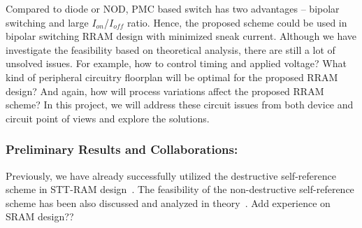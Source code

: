 Compared to diode or NOD, PMC based switch has two advantages -- bipolar switching and large $I_{on}$/$I_{off}$ ratio. Hence, the proposed scheme could be used in bipolar switching RRAM design with minimized sneak current. Although we have investigate the feasibility based on theoretical analysis, there are still a lot of unsolved issues. For example, how to control timing and applied voltage? What kind of peripheral circuitry floorplan will be optimal for the proposed RRAM design? And again, how will process variations affect the proposed RRAM scheme? In this project, we will address these circuit issues from both device and circuit point of views and explore the solutions.


\subsubsection{Preliminary Results and Collaborations:}
Previously, we have already successfully utilized the destructive self-reference scheme in STT-RAM design~\cite{Li:147723}. The feasibility of the non-destructive self-reference scheme has been also discussed and analyzed in theory~\cite{Chen:147727}.
Add experience on SRAM design??
